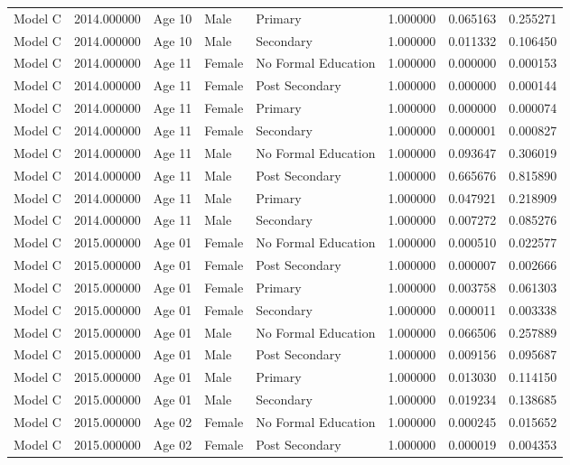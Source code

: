 \begin{table}[ht]
\begin{tabular}{lrlllrrr}
Model C & 2014.000000 & Age 10 & Male & Primary & 1.000000 & 0.065163 & 0.255271 \\
Model C & 2014.000000 & Age 10 & Male & Secondary & 1.000000 & 0.011332 & 0.106450 \\
Model C & 2014.000000 & Age 11 & Female & No Formal Education & 1.000000 & 0.000000 & 0.000153 \\
Model C & 2014.000000 & Age 11 & Female & Post Secondary & 1.000000 & 0.000000 & 0.000144 \\
Model C & 2014.000000 & Age 11 & Female & Primary & 1.000000 & 0.000000 & 0.000074 \\
Model C & 2014.000000 & Age 11 & Female & Secondary & 1.000000 & 0.000001 & 0.000827 \\
Model C & 2014.000000 & Age 11 & Male & No Formal Education & 1.000000 & 0.093647 & 0.306019 \\
Model C & 2014.000000 & Age 11 & Male & Post Secondary & 1.000000 & 0.665676 & 0.815890 \\
Model C & 2014.000000 & Age 11 & Male & Primary & 1.000000 & 0.047921 & 0.218909 \\
Model C & 2014.000000 & Age 11 & Male & Secondary & 1.000000 & 0.007272 & 0.085276 \\
Model C & 2015.000000 & Age 01 & Female & No Formal Education & 1.000000 & 0.000510 & 0.022577 \\
Model C & 2015.000000 & Age 01 & Female & Post Secondary & 1.000000 & 0.000007 & 0.002666 \\
Model C & 2015.000000 & Age 01 & Female & Primary & 1.000000 & 0.003758 & 0.061303 \\
Model C & 2015.000000 & Age 01 & Female & Secondary & 1.000000 & 0.000011 & 0.003338 \\
Model C & 2015.000000 & Age 01 & Male & No Formal Education & 1.000000 & 0.066506 & 0.257889 \\
Model C & 2015.000000 & Age 01 & Male & Post Secondary & 1.000000 & 0.009156 & 0.095687 \\
Model C & 2015.000000 & Age 01 & Male & Primary & 1.000000 & 0.013030 & 0.114150 \\
Model C & 2015.000000 & Age 01 & Male & Secondary & 1.000000 & 0.019234 & 0.138685 \\
Model C & 2015.000000 & Age 02 & Female & No Formal Education & 1.000000 & 0.000245 & 0.015652 \\
Model C & 2015.000000 & Age 02 & Female & Post Secondary & 1.000000 & 0.000019 & 0.004353 \\

\end{tabular}
\end{table}
